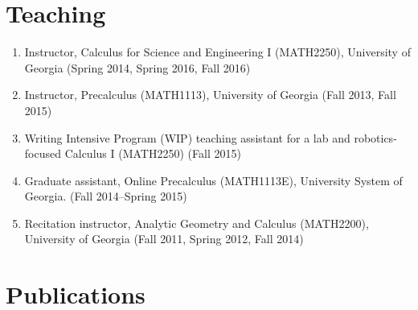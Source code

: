 \documentclass[letterpaper]{article}
\begin{document}
\section*{Teaching}

\begin{enumerate}
\item Instructor, Calculus for Science and Engineering I (MATH2250), University
  of Georgia (Spring 2014, Spring 2016, Fall 2016)
\item Instructor, Precalculus (MATH1113), University of Georgia (Fall 2013, Fall 2015)
\item Writing Intensive Program (WIP) teaching assistant for a lab and robotics-focused Calculus I (MATH2250) (Fall 2015)
\item Graduate assistant, Online
  Precalculus (MATH1113E), University System of Georgia. (Fall 2014--Spring 2015)
\item Recitation instructor, Analytic Geometry and Calculus
  (MATH2200), University of Georgia (Fall 2011, Spring 2012, Fall 2014)
\end{enumerate}

\section*{Publications}
\end{document}
